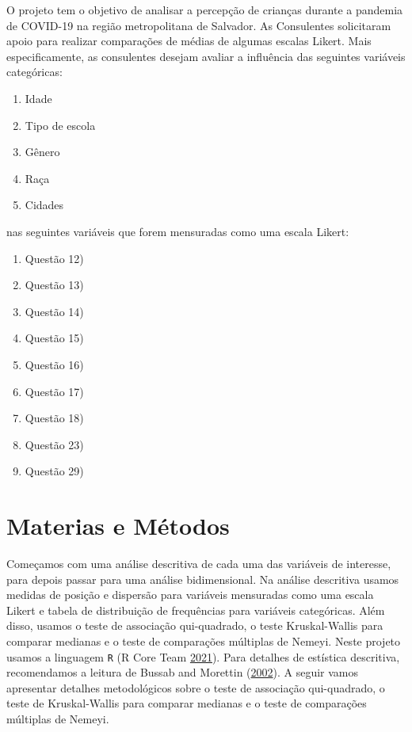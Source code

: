 \documentclass[]{article}
\providecommand{\tightlist}{%
  \setlength{\itemsep}{0pt}\setlength{\parskip}{0pt}}
\begin{document}
O projeto tem o objetivo de analisar a percepção de crianças durante a pandemia de COVID-19 na região metropolitana de Salvador. As Consulentes solicitaram apoio para realizar comparações de médias de algumas escalas Likert. Mais especificamente, as consulentes desejam avaliar a influência das seguintes variáveis categóricas:

\begin{enumerate}
\def\labelenumi{\roman{enumi}.}
\tightlist
\item
  Idade
\item
  Tipo de escola
\item
  Gênero
\item
  Raça
\item
  Cidades
\end{enumerate}

nas seguintes variáveis que forem mensuradas como uma escala Likert:

\begin{enumerate}
\def\labelenumi{\roman{enumi}.}
\tightlist
\item
  Questão 12)
\item
  Questão 13)
\item
  Questão 14)
\item
  Questão 15)
\item
  Questão 16)
\item
  Questão 17)
\item
  Questão 18)
\item
  Questão 23)
\item
  Questão 29)
\end{enumerate}

\hypertarget{materias-e-muxe9todos}{%
\section{Materias e Métodos}\label{materias-e-muxe9todos}}

Começamos com uma análise descritiva de cada uma das variáveis de interesse, para depois passar para uma análise bidimensional. Na análise descritiva usamos medidas de posição e dispersão para variáveis mensuradas como uma escala Likert e tabela de distribuição de frequências para variáveis categóricas. Além disso, usamos o teste de associação qui-quadrado, o teste Kruskal-Wallis para comparar medianas e o teste de comparações múltiplas de Nemeyi. Neste projeto usamos a linguagem \texttt{R} (R Core Team \protect\hyperlink{ref-Rlang}{2021}). Para detalhes de estística descritiva, recomendamos a leitura de Bussab and Morettin (\protect\hyperlink{ref-bussab2002estatistica}{2002}). A seguir vamos apresentar detalhes metodológicos sobre o teste de associação qui-quadrado, o teste de Kruskal-Wallis para comparar medianas e o teste de comparações múltiplas de Nemeyi.
\end{document}
